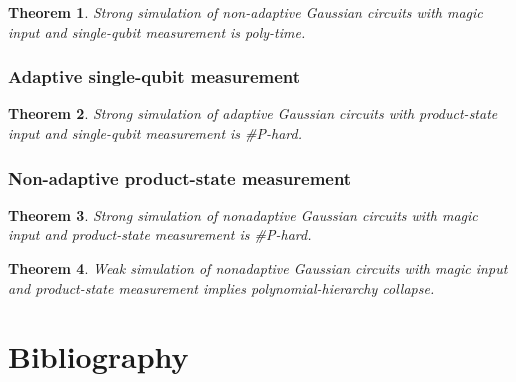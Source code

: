 \documentclass[
]{book}
\newtheorem{theorem}{Theorem}[chapter]
\theoremstyle{definition}
\theoremstyle{definition}
\theoremstyle{definition}
\theoremstyle{definition}
\theoremstyle{remark}
\begin{document}
\begin{theorem}
\protect\hypertarget{thm:naOneSimulation}{}\label{thm:naOneSimulation}Strong simulation of
non-adaptive Gaussian circuits with magic input
and single-qubit measurement is poly-time.
\end{theorem}

\subsection{Adaptive single-qubit measurement}\label{adaptive-single-qubit-measurement}

\begin{theorem}
\protect\hypertarget{thm:aOneSimulation}{}\label{thm:aOneSimulation}Strong simulation of adaptive Gaussian circuits with product-state input
and single-qubit measurement is \#P-hard.
\end{theorem}

\subsection{Non-adaptive product-state measurement}\label{non-adaptive-product-state-measurement}

\begin{theorem}
\protect\hypertarget{thm:naProdSimulation}{}\label{thm:naProdSimulation}Strong simulation of nonadaptive Gaussian circuits with
magic input and product-state measurement is \#P-hard.
\end{theorem}

\begin{theorem}
\protect\hypertarget{thm:naMagicSimulation}{}\label{thm:naMagicSimulation}Weak simulation of nonadaptive Gaussian circuits with
magic input and product-state measurement implies polynomial-hierarchy collapse.
\end{theorem}

\chapter*{Bibliography}\label{bibliography}
\end{document}
